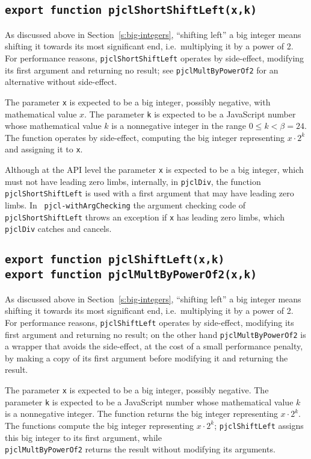 \documentclass[12pt]{article}
\begin{document}
\subsection{\tt export function pjclShortShiftLeft(x,k)}

As discussed above in Section~\ref{s:big-integers}, ``shifting left'' a big integer
means shifting it towards its most significant end, i.e.\ multiplying it by a power of 2.
For performance reasons, {\tt pjclShortShiftLeft} operates by side-effect, modifying its first argument and returning no result; see {\tt pjclMultByPowerOf2} for an alternative without side-effect.

The parameter {\tt x} is expected to be a big integer, possibly negative, with
mathematical value $x$.  The parameter {\tt k} is expected to be a JavaScript number
whose mathematical value $k$ is a nonnegative integer in the range $0
\leq k < \beta = 24$.  The function operates by side-effect, computing the big integer representing
$x\cdot2^k$ and assigning it to {\tt x}.

Although at the API level the parameter {\tt x} is expected to be a
big integer, which must not have leading zero limbs, internally, in
{\tt pjclDiv}, the function {\tt pjclShortShiftLeft} is used with a
first argument that may have leading zero limbs.  In {\tt
  pjcl-withArgChecking} the argument checking code of {\tt
  pjclShortShiftLeft} throws an exception if {\tt x} has leading zero
limbs, which {\tt pjclDiv} catches and cancels.

\subsection{\tt export function pjclShiftLeft(x,k)\\export function pjclMultByPowerOf2(x,k)}

As discussed above in Section~\ref{s:big-integers}, ``shifting left'' a big integer
means shifting it towards its most significant end, i.e.\ multiplying it by a power of 2.
For performance reasons, {\tt pjclShiftLeft} operates by side-effect, modifying its first argument and returning no result; on the other hand {\tt pjclMultByPowerOf2} is a wrapper that avoids the side-effect, at the cost of a small performance penalty, by making a copy of its first argument before modifying it and returning the result.

The parameter {\tt x} is expected to be a big integer, possibly negative.  The parameter {\tt k} is expected to be a JavaScript number
whose mathematical value $k$ is a nonnegative integer.  The function
returns the big integer representing $x\cdot2^k$.  The functions compute the big integer representing
$x\cdot2^k$; {\tt pjclShiftLeft} assigns this big integer to its first argument,
while\\{\tt pjclMultByPowerOf2} returns the result without modifying its arguments.
\end{document}
